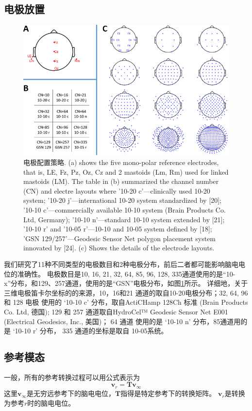 \subsection{电极放置}
\begin{figure}[h!]
	\centering
	\includegraphics[width=15cm]{pic/JNE/figure2.png}
	\caption{电极配置策略. (a) shows the five mono-polar reference electrodes, that is, LE, Fz, Pz, Oz, Cz and 2 mastoids (Lm, Rm) used for linked mastoids (LM). The table in (b) summarized the channel number (CN) and electre layouts where '10-20 c'—clinically used 10-20 system; '10-20 j'—international 10-20 system standardized by [20]; '10-10 c'—commercially available 10-10 system (Brain Products Co. Ltd, Germany); '10-10 n'—standard 10-10 system extended by [21]; '10-10 r' and '10-05 r'—10-10 and 10-05 system defined by [18]; 'GSN 129/257'—Geodesic Sensor Net polygon placement system innovated by [24]. (c) Shows the details of the electrode layouts.}
	\label{2.2}
\end{figure}
我们研究了11种不同类型的电极数目和2种电极分布，前后二者都可能影响脑电电位的准确性。 电极数目是10, 16, 21, 32, 64, 85, 96, 128, 335通道使用的是“10-x”分布，和129、257通道，使用的是“GSN”电极分布，如图\ref{2.2}所示。 详细地，关于三维电极笛卡尔坐标的的来源，10，16和21 通道的取自10-20电极分布；32, 64, 96 和 128 电极 使用的 ‘10-10 c’
分布，取自ActiCHamp 128Ch 标准 (Brain Products Co. Ltd, 德国); 129 和 257 通道取自HydroCel™ Geodesic Sensor Net E001 (Electrical Geodesics, Inc., 美国)； 64 通道 使用的是 ‘10-10 n’ 分布，85通道用的是 ‘10-10 r’ 分布， 335 通道的坐标是取自
10-05系统。
\subsection{参考模态}
一般，所有的参考转换过程可以用公式表示为
\begin{equation}\label{eq2.3}
\mathbf{v}_r=\mathbf{Tv}_{\infty}
\end{equation}
这里$\mathbf{v}_{\infty}$是无穷远参考下的脑电电位，$\mathbf{T}$指得是特定参考下的转换矩阵。 $\mathbf{v}_r$是转换为参考$r$时的脑电电位。
